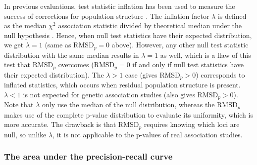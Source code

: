 \documentclass[11pt]{article}
\newcommand{\rmsd}{\text{RMSD}_p}
\begin{document}
In previous evaluations, test statistic inflation has been used to measure the success of corrections for population structure \citep{astle_population_2009, price_new_2010}.
The inflation factor $\lambda$ is defined as the median $\chi^2$ association statistic divided by theoretical median under the null hypothesis \citep{devlin_genomic_1999}.
Hence, when null test statistics have their expected distribution, we get $\lambda = 1$ (same as $\rmsd = 0$ above).
However, any other null test statistic distribution with the same median results in $\lambda = 1$ as well, which is a flaw of this test that $\rmsd$ overcomes ($\rmsd = 0$ if and only if null test statistics have their expected distribution).
The $\lambda > 1$ case (gives $\rmsd > 0$) corresponds to inflated statistics, which occurs when residual population structure is present.
$\lambda < 1$ is not expected for genetic association studies (also gives $\rmsd > 0$).
Note that $\lambda$ only use the median of the null distribution, whereas the $\rmsd$ makes use of the complete p-value distribution to evaluate its uniformity, which is more accurate.
The drawback is that $\rmsd$ requires knowing which loci are null, so unlike $\lambda$, it is not applicable to the p-values of real association studies.

\subsubsection{The area under the precision-recall curve}
\end{document}
